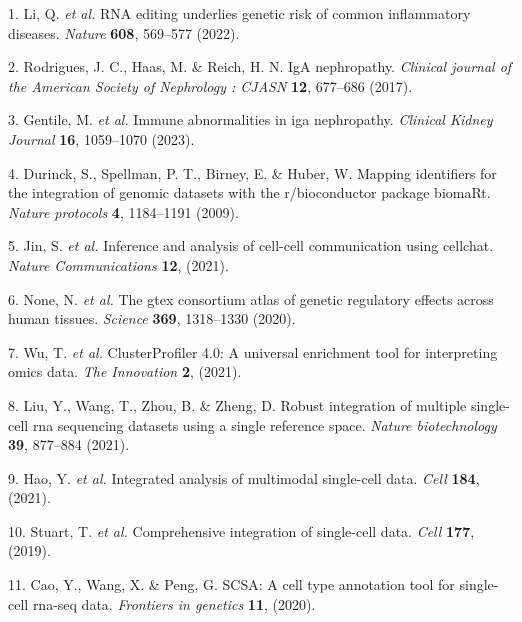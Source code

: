 \documentclass[
]{article}
\newenvironment{cslreferences}%
  {}%
  {\par}
\begin{document}
\hypertarget{refs}{}
\begin{cslreferences}
\leavevmode\hypertarget{ref-RnaEditingUndLiQi2022}{}%
1. Li, Q. \emph{et al.} RNA editing underlies genetic risk of common inflammatory diseases. \emph{Nature} \textbf{608}, 569--577 (2022).

\leavevmode\hypertarget{ref-IgaNephropathyRodrig2017}{}%
2. Rodrigues, J. C., Haas, M. \& Reich, H. N. IgA nephropathy. \emph{Clinical journal of the American Society of Nephrology : CJASN} \textbf{12}, 677--686 (2017).

\leavevmode\hypertarget{ref-ImmuneAbnormalGentil2023}{}%
3. Gentile, M. \emph{et al.} Immune abnormalities in iga nephropathy. \emph{Clinical Kidney Journal} \textbf{16}, 1059--1070 (2023).

\leavevmode\hypertarget{ref-MappingIdentifDurinc2009}{}%
4. Durinck, S., Spellman, P. T., Birney, E. \& Huber, W. Mapping identifiers for the integration of genomic datasets with the r/bioconductor package biomaRt. \emph{Nature protocols} \textbf{4}, 1184--1191 (2009).

\leavevmode\hypertarget{ref-InferenceAndAJinS2021}{}%
5. Jin, S. \emph{et al.} Inference and analysis of cell-cell communication using cellchat. \emph{Nature Communications} \textbf{12}, (2021).

\leavevmode\hypertarget{ref-TheGtexConsorNone2020}{}%
6. None, N. \emph{et al.} The gtex consortium atlas of genetic regulatory effects across human tissues. \emph{Science} \textbf{369}, 1318--1330 (2020).

\leavevmode\hypertarget{ref-ClusterprofilerWuTi2021}{}%
7. Wu, T. \emph{et al.} ClusterProfiler 4.0: A universal enrichment tool for interpreting omics data. \emph{The Innovation} \textbf{2}, (2021).

\leavevmode\hypertarget{ref-RobustIntegratLiuY2021}{}%
8. Liu, Y., Wang, T., Zhou, B. \& Zheng, D. Robust integration of multiple single-cell rna sequencing datasets using a single reference space. \emph{Nature biotechnology} \textbf{39}, 877--884 (2021).

\leavevmode\hypertarget{ref-IntegratedAnalHaoY2021}{}%
9. Hao, Y. \emph{et al.} Integrated analysis of multimodal single-cell data. \emph{Cell} \textbf{184}, (2021).

\leavevmode\hypertarget{ref-ComprehensiveIStuart2019}{}%
10. Stuart, T. \emph{et al.} Comprehensive integration of single-cell data. \emph{Cell} \textbf{177}, (2019).

\leavevmode\hypertarget{ref-ScsaACellTyCaoY2020}{}%
11. Cao, Y., Wang, X. \& Peng, G. SCSA: A cell type annotation tool for single-cell rna-seq data. \emph{Frontiers in genetics} \textbf{11}, (2020).


\end{cslreferences}
\end{document}
